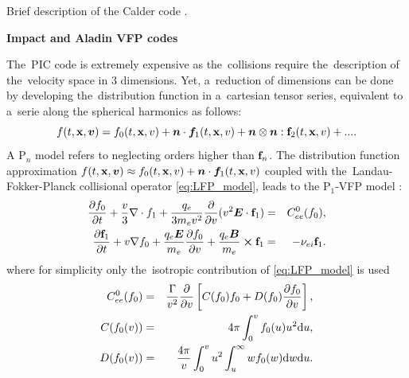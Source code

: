Brief description of the Calder code .

\textbf{Impact and Aladin VFP codes}

The~PIC code is extremely expensive as the~collisions require the~description 
of the~velocity space in 3 dimensions. Yet, a~reduction of dimensions can be 
done by developing the~distribution function in a~cartesian tensor series, 
equivalent to a~serie along the spherical harmonics \cite{Johnston_PR1960}
as follows:
\begin{equation}
  f(t,\mathbf{x},\boldsymbol{v}) = f_0(t,\mathbf{x},v) 
  + \boldsymbol{n}\cdot \boldsymbol{f}_1(t,\mathbf{x},v)
  +\boldsymbol{n}\otimes\boldsymbol{n}:\mathbf{f}_2(t,\mathbf{x},v)+... .
  \label{Pn}
\end{equation}
A P$_n$ model refers to 
neglecting orders higher than $\mathbf{f}_n$. The distribution function 
approximation $f(t,\mathbf{x},\boldsymbol{v})\approx f_0(t,\mathbf{x},v)
+\boldsymbol{n}\cdot \boldsymbol{f}_1(t,\mathbf{x},v)$ coupled with 
the~Landau-Fokker-Planck collisional operator 
\eqref{eq:LFP_model}, leads to the P$_1$-VFP model 
\cite{Johnston_PR1960, Kingham_JCP2004}:
\begin{eqnarray}
\frac{\partial f_0}{\partial t}+\frac{v}{3}\nabla \cdot f_1
+\frac{q_e}{3m_ev^2}\frac{\partial}{\partial v}(v^2\boldsymbol{E}\cdot \mathbf{f}_1)
&=&
C^0_{ee}(f_0) ,
 \label{eq:P1f0_Aladin}\\
\frac{\partial \mathbf{f}_1}{\partial t}+v\nabla f_0
+ \frac{q_e\boldsymbol{E}}{m_e}\frac{\partial f_0}{\partial v}
+\frac{q_e\boldsymbol{B}}{m_e}\boldsymbol{\times} \mathbf{f}_1 
&=&
- \nu_{ei}\mathbf{f}_1 .
\label{eq:P1f1_Aladin}
\end{eqnarray}
where for simplicity only the~isotropic 
contribution of \eqref{eq:LFP_model} is used 
\begin{eqnarray} 
C^0_{ee}(f_0) &=& \frac{\Gamma}{v^2}\frac{\partial}{\partial v}
\left[C(f_0)f_0+D(f_0)\frac{\partial f_0}{\partial v}\right] ,
\\
C(f_0(v)) &=& 4\pi\int_0^v f_0(u) u^2 \text{d} u ,
\\
D(f_0(v)) &=& \frac{4\pi}{v}\int_0^v u^2\int_u^\infty w f_0(w) 
\text{d} w \text{d} u .
\end{eqnarray}

 %

